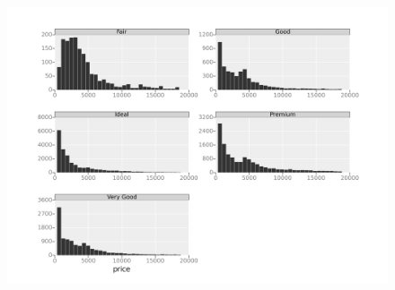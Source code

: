 \documentclass{beamer}
\begin{document}
\begin{frame}
	\begin{figure}
		\centering
		\includegraphics[width=0.7\linewidth]{FacetsB}
		\caption{}
		\label{fig:FacetsB}
	\end{figure}
	
\end{frame}
\end{document}
